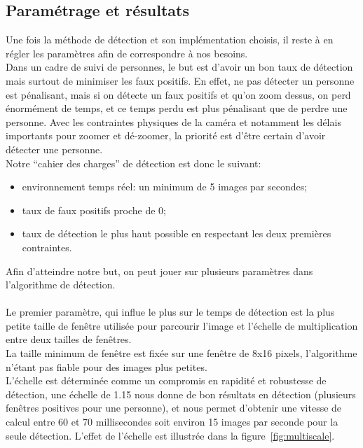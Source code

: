 \documentclass[12pt]{article}
\begin{document}
\subsection{Paramétrage et résultats}
Une fois la méthode de détection et son implémentation choisis, il reste à en régler les paramètres afin de correspondre à nos besoins.\\
Dans un cadre de suivi de personnes, le but est d'avoir un bon taux de détection mais surtout de minimiser les faux positifs. En effet, ne pas détecter un personne est pénalisant, mais si on détecte un faux positifs et qu'on zoom dessus, on perd énormément de temps, et ce temps perdu est plus pénalisant que de perdre une personne. Avec les contraintes physiques de la caméra et notamment les délais importants pour zoomer et dé-zoomer, la priorité est d'être certain d'avoir détecter une personne.\\
Notre ``cahier des charges'' de détection est donc le suivant:
\begin{itemize}  
	\item environnement temps réel: un minimum de 5 images par secondes; 
	\item taux de faux positifs proche de 0;
	\item taux de détection le plus haut possible en respectant les deux premières contraintes.
\end{itemize}
Afin d'atteindre notre but, on peut jouer sur plusieurs paramètres dans l'algorithme de détection.\\
\\
Le premier paramètre, qui influe le plus sur le temps de détection est la plus petite taille de fenêtre utilisée pour parcourir l'image et l'échelle de multiplication entre deux tailles de fenêtres.\\
La taille minimum de fenêtre est fixée sur une fenêtre de 8x16 pixels, l'algorithme n'étant pas fiable pour des images plus petites.\\
L'échelle est déterminée comme un compromis en rapidité et robustesse de détection, une échelle de 1.15 nous donne de bon résultats en détection (plusieurs fenêtres positives pour une personne), et nous permet d'obtenir une vitesse de calcul entre 60 et 70 millisecondes soit environ 15 images par seconde pour la seule détection. L'effet de l'échelle est illustrée dans la figure~\ref{fig:multiscale}.\\
\end{document}
